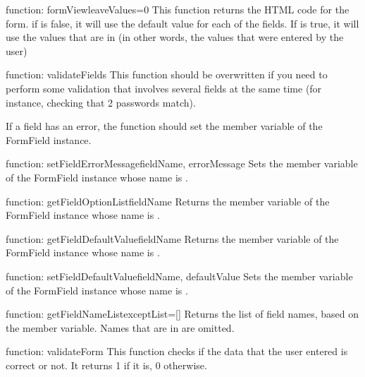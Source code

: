 \begin{funcdesc}{function: formView}{leaveValues=0}
This function returns the HTML code for the form. if  is false, it will use the default value
for each of the fields. If  is true, it will use the values that are in  (in other
words, the values that were entered by the user)
\end{funcdesc}

\begin{funcdesc}{function: validateFields}{}
This function should be overwritten if you need to perform some validation that involves several fields at the
same time (for instance, checking that 2 passwords match).

If a field has an error, the function should set the  member variable of the FormField instance.
\end{funcdesc}

\begin{funcdesc}{function: setFieldErrorMessage}{fieldName, errorMessage}
Sets the  member variable of the FormField instance whose name is .
\end{funcdesc}

\begin{funcdesc}{function: getFieldOptionList}{fieldName}
Returns the  member variable of the FormField instance whose name is .
\end{funcdesc}

\begin{funcdesc}{function: getFieldDefaultValue}{fieldName}
Returns the  member variable of the FormField instance whose name is .
\end{funcdesc}

\begin{funcdesc}{function: setFieldDefaultValue}{fieldName, defaultValue}
Sets the  member variable of the FormField instance whose name is .
\end{funcdesc}

\begin{funcdesc}{function: getFieldNameList}{exceptList=[]}
Returns the list of field names, based on the  member variable. Names that are in  are omitted.
\end{funcdesc}

\begin{funcdesc}{function: validateForm}{}
This function checks if the data that the user entered is correct or not. It returns 1 if it is, 0 otherwise.
\end{funcdesc}

